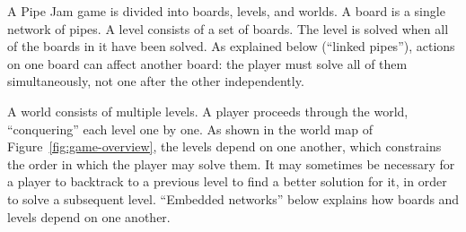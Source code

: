 \documentclass{sig-alternate}
\let\Description =\description
\def\Nospacing{\itemsep=0pt\topsep=0pt\partopsep=0pt\parskip=0pt\parsep=0pt}
\renewenvironment{description}{\Description\Nospacing}{\endlist}
\begin{document}
\begin{description}

\item[Boards and levels]
  A Pipe Jam game is divided into boards, levels, and worlds.  A board is a
  single network of pipes.  A level consists of a set of boards.  The level
  is solved when all of the boards in it have been solved.  As explained
  below (``linked pipes''), actions on one board can affect another board:
  the player must solve all of them simultaneously, not one after the other
  independently.

\item[Levels and worlds]
  A world consists of multiple levels.  A player proceeds through the
  world, ``conquering'' each level one by one.  As shown in the world map
  of Figure~\ref{fig:game-overview}, the levels depend on one another,
  which constrains the order in which the player may solve them.  It may
  sometimes be necessary for a player to backtrack to a previous level to
  find a better solution for it, in order to solve a subsequent level.
  ``Embedded networks'' below explains how boards and levels depend on one
  another.


\end{description}
\end{document}
